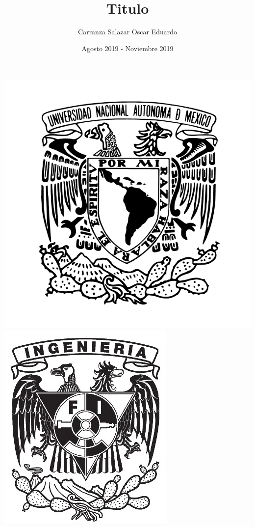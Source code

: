 \documentclass[11pt, letterpaper]{report}
\title{Titulo}
\author{Carranza Salazar Oscar Eduardo}
\date{Agosto 2019 - Noviembre 2019}
\begin{document}

\begin{titlepage}
	\begin{center}
		\includegraphics[scale=0.17]{UNAM.PNG} 
		\hfill 
		\includegraphics[scale=0.32]{IMG_7106.JPG}
	\end{center}


\end{titlepage}
\end{document}
